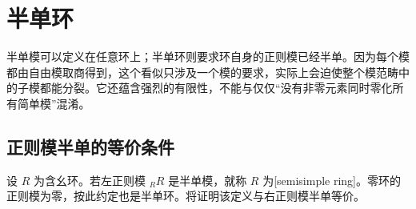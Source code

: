 
\section{半单环}
\label{b2:sec:1302}

半单模可以定义在任意环上；半单环则要求环自身的正则模已经半单。因为每个模都由自由模取商得到，这个看似只涉及一个模的要求，实际上会迫使整个模范畴中的子模都能分裂。它还蕴含强烈的有限性，不能与仅仅“没有非零元素同时零化所有简单模”混淆。

%
%

\subsection{正则模半单的等价条件}
\label{b2:subsec:1302:01}

\begin{definition}\label{b2:def:semisimple-ring}
	设 \(R\) 为含幺环。若左正则模 \({}_RR\) 是半单模，就称 \(R\) 为[semisimple ring]。零环的正则模为零，按此约定也是半单环。将证明该定义与右正则模半单等价。
\end{definition}

